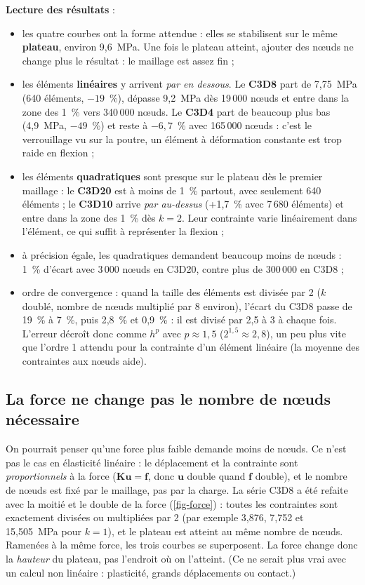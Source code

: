 \documentclass[11pt,a4paper]{article}
\newcommand{\vb}[1]{\mathbf{#1}}
\begin{document}
\textbf{Lecture des résultats} :
\begin{itemize}
  \item les quatre courbes ont la forme attendue : elles se stabilisent sur le même \textbf{plateau}, environ
  9,6~MPa. Une fois le plateau atteint, ajouter des nœuds ne change plus le résultat : le maillage est assez fin ;
  \item les éléments \textbf{linéaires} y arrivent \emph{par en dessous}. Le \textbf{C3D8} part de 7,75~MPa
  (640 éléments, $-19$~\%), dépasse 9,2~MPa dès 19\,000 nœuds et entre dans la zone des 1~\% vers 340\,000 nœuds. Le
  \textbf{C3D4} part de beaucoup plus bas (4,9~MPa, $-49$~\%) et reste à $-6{,}7$~\% avec 165\,000 nœuds : c'est le
  verrouillage vu sur la poutre, un élément à déformation constante est trop raide en flexion ;
  \item les éléments \textbf{quadratiques} sont presque sur le plateau dès le premier maillage : le \textbf{C3D20}
  est à moins de 1~\% partout, avec seulement 640 éléments ; le \textbf{C3D10} arrive \emph{par au-dessus} (+1,7~\% avec
  7\,680 éléments) et entre dans la zone des 1~\% dès $k = 2$. Leur contrainte varie linéairement dans l'élément, ce
  qui suffit à représenter la flexion ;
  \item à précision égale, les quadratiques demandent beaucoup moins de nœuds : 1~\% d'écart avec 3\,000 nœuds en
  C3D20, contre plus de 300\,000 en C3D8 ;
  \item ordre de convergence : quand la taille des éléments est divisée par 2 ($k$ doublé, nombre de nœuds multiplié
  par 8 environ), l'écart du C3D8 passe de 19~\% à 7~\%, puis 2,8~\% et 0,9~\% : il est divisé par 2,5 à 3 à chaque
  fois. L'erreur décroît donc comme $h^{p}$ avec $p \approx 1{,}5$ ($2^{1{,}5} \approx 2{,}8$), un peu plus vite que
  l'ordre 1 attendu pour la contrainte d'un élément linéaire (la moyenne des contraintes aux nœuds aide).
\end{itemize}

\subsection{La force ne change pas le nombre de nœuds nécessaire}
\label{sec-force}

On pourrait penser qu'une force plus faible demande moins de nœuds. Ce n'est pas le cas en élasticité linéaire : le
déplacement et la contrainte sont \emph{proportionnels} à la force ($\vb{K}\vb{u} = \vb{f}$, donc $\vb{u}$ double quand
$\vb{f}$ double), et le nombre de nœuds est fixé par le maillage, pas par la charge. La série C3D8 a été refaite avec la
moitié et le double de la force (\cref{fig-force}) : toutes les contraintes sont exactement divisées ou multipliées par 2
(par exemple 3,876, 7,752 et 15,505~MPa pour $k = 1$), et le plateau est atteint au même nombre de nœuds. Ramenées à
la même force, les trois courbes se superposent. La force change donc la \emph{hauteur} du plateau, pas l'endroit où on
l'atteint. (Ce ne serait plus vrai avec un calcul non linéaire : plasticité, grands déplacements ou contact.)
\end{document}
